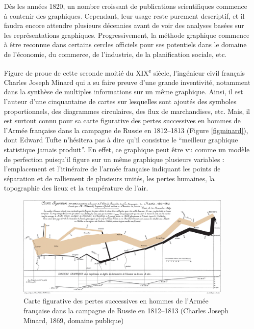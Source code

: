 \documentclass[]{article}
\begin{document}
Dès les années 1820, un nombre croissant de publications scientifiques commence à contenir des graphiques. Cependant, leur usage reste purement descriptif, et il faudra encore attendre plusieurs décennies avant de voir des analyses basées sur les représentations graphiques. Progressivement, la méthode graphique commence à être reconnue dans certains cercles officiels pour ses potentiels dans le domaine de l'économie, du commerce, de l'industrie, de la planification sociale, etc.

Figure de proue de cette seconde moitié du XIX\textsuperscript{e} siècle, l'ingénieur civil français Charles Joseph Minard qui a su faire preuve d'une grande inventivité, notamment dans la synthèse de multiples informations sur un même graphique. Ainsi, il est l'auteur d'une cinquantaine de cartes sur lesquelles sont ajoutés des symboles proportionnels, des diagrammes circulaires, des flux de marchandises, etc. Mais, il est surtout connu pour sa carte figurative des pertes successives en hommes de l'Armée française dans la campagne de Russie en 1812--1813 (Figure \ref{figminard}), dont Edward Tufte n'hésitera pas à dire qu'il consistue le ``meilleur graphique statistique jamais produit''. En effet, ce graphique peut être vu comme un modèle de perfection puisqu'il figure sur un même graphique plusieurs variables : l'emplacement et l'itinéraire de l'armée française indiquant les points de séparation et de ralliement de plusieurs unités, les pertes humaines, la topographie des lieux et la température de l'air.

\begin{figure}
\centering
\includegraphics[width=0.95\textwidth,height=\textheight]{img/chap1/minard.png}
\caption{Carte figurative des pertes successives en hommes de l'Armée française dans la campagne de Russie en 1812--1813 (Charles Joseph Minard, 1869, domaine publique)}
\end{figure}
\end{document}
